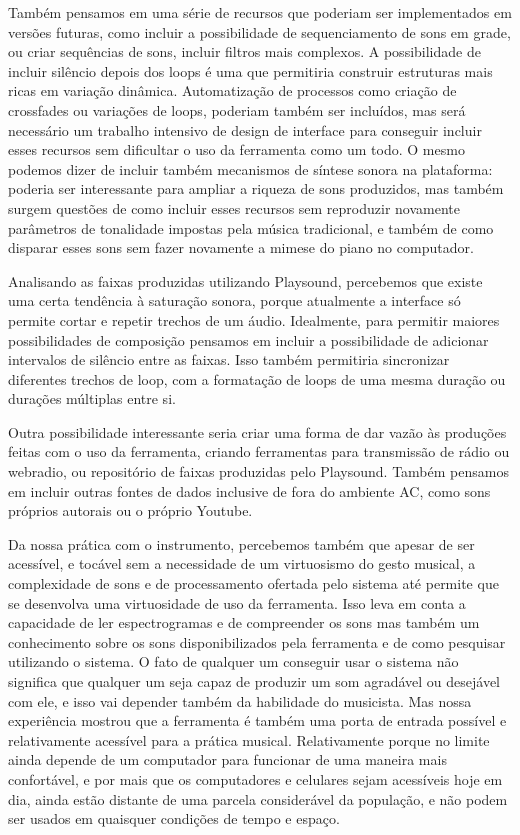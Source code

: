 Também pensamos em uma série de recursos que poderiam ser implementados em versões futuras, como incluir a possibilidade de sequenciamento de sons em grade, ou criar sequências de sons, incluir filtros mais complexos. A possibilidade de incluir silêncio depois dos loops é uma que permitiria construir estruturas mais ricas em variação dinâmica. Automatização de processos como criação de crossfades ou variações de loops, poderiam também ser incluídos, mas será necessário um trabalho intensivo de design de interface para conseguir incluir esses recursos sem dificultar o uso da ferramenta como um todo. O mesmo podemos dizer de incluir também mecanismos de síntese sonora na plataforma: poderia ser interessante para ampliar a riqueza de sons produzidos, mas também surgem questões de como incluir esses recursos sem reproduzir novamente parâmetros de tonalidade impostas pela música tradicional, e também de como disparar esses sons sem fazer novamente a mimese do piano no computador.

Analisando as faixas produzidas utilizando Playsound, percebemos que existe uma certa tendência à saturação sonora, porque atualmente a interface só permite cortar e repetir trechos de um áudio. Idealmente, para permitir maiores possibilidades de composição pensamos em incluir a possibilidade de adicionar intervalos de silêncio entre as faixas. Isso também permitiria sincronizar diferentes trechos de loop, com a formatação de loops de uma mesma duração ou durações múltiplas entre si.

Outra possibilidade interessante seria criar uma forma de dar vazão às produções feitas com o uso da ferramenta, criando ferramentas para transmissão de rádio ou webradio, ou repositório de faixas produzidas pelo Playsound. Também pensamos em incluir outras fontes de dados inclusive de fora do ambiente AC, como sons próprios autorais ou o próprio Youtube.

Da nossa prática com o instrumento, percebemos também que apesar de ser acessível, e tocável sem a necessidade de um virtuosismo do gesto musical, a complexidade de sons e de processamento ofertada pelo sistema até permite que se desenvolva uma virtuosidade de uso da ferramenta. Isso leva em conta a capacidade de ler espectrogramas e de compreender os sons mas também um conhecimento sobre os sons disponibilizados pela ferramenta e de como pesquisar utilizando o sistema. O fato de qualquer um conseguir usar o sistema não significa que qualquer um seja capaz de produzir um som agradável ou desejável com ele, e isso vai depender também da habilidade do musicista. Mas nossa experiência mostrou que a ferramenta é também uma porta de entrada possível e relativamente acessível para a prática musical. Relativamente porque no limite ainda depende de um computador para funcionar de uma maneira mais confortável, e por mais que os computadores e celulares sejam acessíveis hoje em dia, ainda estão distante de uma parcela considerável da população, e não podem ser usados em quaisquer condições de tempo e espaço. 

